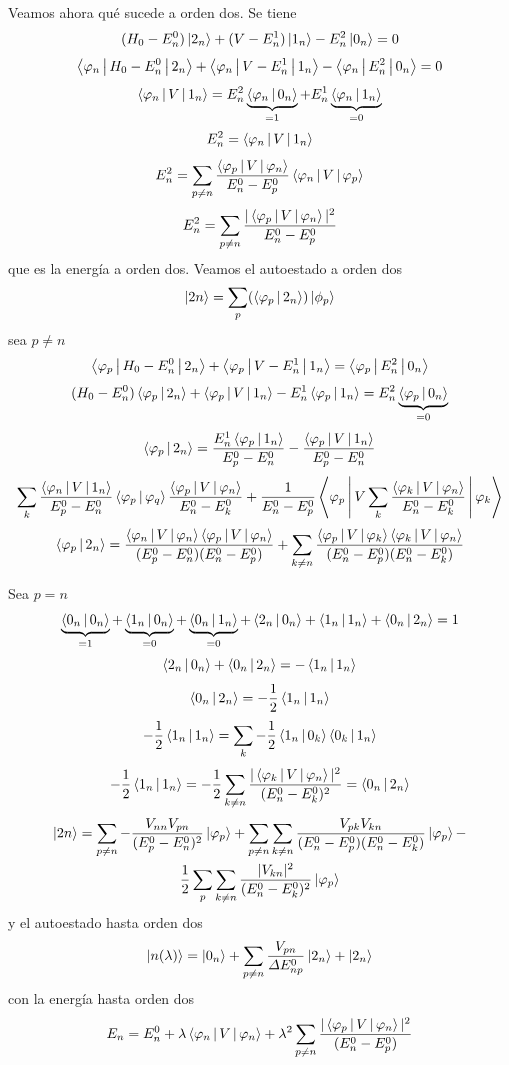 \documentclass[10pt,oneside]{CBFT_book}
\begin{document}
Veamos ahora qué sucede a orden dos. Se tiene
\[
	(H_0 - E_n^0)\Ket{2_n} + (V - E_n^1)\Ket{1_n}- E_n^2\Ket{0_n} = 0
\]
\[
	\Braket{\varphi_n|H_0 - E_n^0|2_n } + \Braket{\varphi_n|V - E_n^1|1_n}- 
	\Braket{\varphi_n|E_n^2|0_n} = 0
\]
\[
	\Braket{\varphi_n|V|1_n} = 
	 E_n^2\underbrace{\Braket{\varphi_n|0_n}}_{=1} + E_n^1\underbrace{\Braket{\varphi_n|1_n}}_{=0}
\]
\[
	E_n^2 = \Braket{\varphi_n|V|1_n}
\]
\[
	E_n^2 = \sum_{p\neq n} \frac{\Braket{\varphi_p|V|\varphi_n}}{E_n^0 - E_p^0} \Braket{\varphi_n|V|\varphi_p}
\]
\[
	E_n^2 = \sum_{p\neq n} \frac{|\Braket{\varphi_p|V|\varphi_n}|^2}{E_n^0 - E_p^0} 
\]
que es la energía a orden dos.
Veamos el autoestado a orden dos 
\[
	\Ket{2n} = \sum_p (\Braket{\varphi_p|2_n})\Ket{\phi_p}
\]
sea $p\neq n$ 
\[
	\Braket{\varphi_p|H_0 - E_n^0|2_n } + \Braket{\varphi_p|V - E_n^1|1_n} = 
	\Braket{\varphi_p|E_n^2|0_n}
\]
\[
	(H_0 - E_n^0)\Braket{\varphi_p|2_n } + \Braket{\varphi_p|V|1_n} -
	E_n^1\Braket{\varphi_p|1_n} = E_n^2\underbrace{\Braket{\varphi_p|0_n}}_{=0}
\]
\[
	\Braket{\varphi_p|2_n } = \frac{E_n^1\Braket{\varphi_p|1_n}}{E_p^0 - E_n^0} - 
	\frac{\Braket{\varphi_p|V|1_n}}{E_p^0 - E_n^0}
\]
\[
	\sum_k \frac{\Braket{\varphi_n|V|1_n}}{E_p^0 - E_n^0}\Braket{\varphi_p|\varphi_q}
	\frac{\Braket{\varphi_p|V|\varphi_n}}{E_n^0 - E_k^0} + \frac{1}{E_n^0 - E_p^0}
	\Braket{\varphi_p|V\sum_k \frac{\Braket{\varphi_k|V|\varphi_n}}{E_n^0 - E_k^0} |\varphi_k}
\]
\[
	\Braket{\varphi_p|2_n} = \frac{\Braket{\varphi_n|V|\varphi_n}\Braket{\varphi_p|V|\varphi_n}}
		{(E_p^0 - E_n^0)(E_n^0 - E_p^0)} + \sum_{k\neq n} 
		\frac{\Braket{\varphi_p|V|\varphi_k}\Braket{\varphi_k|V|\varphi_n}}
		{(E_n^0 - E_p^0)(E_n^0 - E_k^0)}
\]

Sea $p=n$
\[
	\underbrace{\Braket{0_n|0_n}}_{=1} + \underbrace{\Braket{1_n|0_n}}_{=0} +
	\underbrace{\Braket{0_n|1_n}}_{=0} +
	\Braket{2_n|0_n} + \Braket{1_n|1_n} + \Braket{0_n|2_n} = 1
\]
\[
	\Braket{2_n|0_n} + \Braket{0_n|2_n}  = - \Braket{1_n|1_n}
\]
\[
	 \Braket{0_n|2_n} = -\frac{1}{2}  \Braket{1_n|1_n} 
\]
\[
	 -\frac{1}{2}\Braket{1_n|1_n} = \sum_{k} -\frac{1}{2}\Braket{1_n|0_k}\Braket{0_k|1_n}
\]
\[
	-\frac{1}{2}\Braket{1_n|1_n} = -\frac{1}{2} \sum_{k\neq n} 
	\frac{|\Braket{\varphi_k|V|\varphi_n}|^2}{( E_n^0 - E_k^0 )^2} = \Braket{0_n|2_n}
\]
\begin{multline*}
	\Ket{2n} = \sum_{p\neq n} -\frac{V_{nn}V_{pn}}{(E_p^0 - E_n^0)^2} \Ket{\varphi_p} + 
	\sum_{p\neq n}\sum_{k\neq n} \frac{V_{pk}V_{kn}}{(E_n^0 - E_p^0)(E_n^0 - E_k^0)} \Ket{\varphi_p} -\\
		\frac{1}{2}\sum_p\sum_{k\neq n} \frac{|V_{kn}|^2}{(E_n^0 - E_k^0)^2}\Ket{\varphi_p}  
\end{multline*}
y el autoestado hasta orden dos
\[
	\Ket{n(\lambda)} = \Ket{0_n} + \sum_{p\neq n} \frac{V_{pn}}{\Delta E_{np}^0} \Ket{2_n} + \Ket{2_n} 
\]
con la energía hasta orden dos 
\[
	E_n = E_n^0 + \lambda\Braket{\varphi_n|V|\varphi_n} + \lambda^2 \sum_{p\neq n} 
		\frac{|\Braket{\varphi_p|V|\varphi_n}|^2}{( E_n^0 - E_p^0 )}
\]
\end{document}
